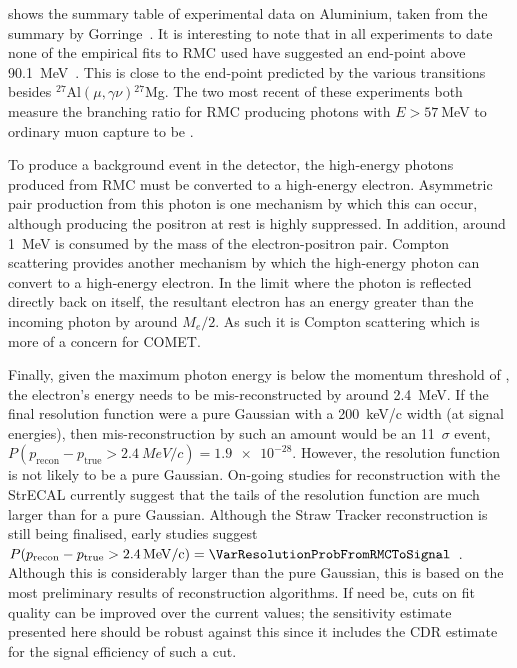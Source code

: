 \FigRMCExperiments

 shows the summary table of experimental data on Aluminium, taken from the summary by Gorringe~\cite{RevModPhys.76.31}.
It is interesting to note that in all experiments to date none of the empirical fits to RMC used have suggested an end-point above 90.1~MeV~\cite{PhysRevC.37.1633,PhysRevC.46.1094,PhysRevC.59.2853}.
This is close to the end-point predicted by the various transitions besides ${}^{27}$Al$(\mu,\gamma\nu){}^{27}$Mg.
The two most recent of these experiments both measure the branching ratio for \ac{RMC} producing photons with $E>57~$MeV to ordinary muon capture to be . 

To produce a background event in the detector, the high-energy photons produced from RMC must be converted to a high-energy electron.
Asymmetric pair production from this photon is one mechanism by which this can occur, although producing the positron at rest is highly suppressed.
In addition, around 1~MeV is consumed by the mass of the electron-positron pair.
Compton scattering provides another mechanism by which the high-energy photon can convert to a high-energy electron.
In the limit where the photon is reflected directly back on itself, the resultant electron has an energy greater than the incoming photon by around $M_e/2$.
As such it is Compton scattering which is more of a concern for COMET.

Finally, given the maximum photon energy is below the momentum threshold of \VarMomThreshold, the electron's energy needs to be mis-reconstructed by around 2.4~MeV.
If the final resolution function were a pure Gaussian with a 200~keV/c width (at signal energies), then mis-reconstruction by such an amount would be an 11~$\sigma$ event, \ie $P(p_\textrm{recon}-p_\textrm{true}>\SI{2.4}{MeV/c})=\num{1.9e-28}$.
However, the resolution function is not likely to be a pure Gaussian.
On-going studies for reconstruction with the  \phaseI StrECAL currently suggest that the tails of the resolution function are much larger than for a pure Gaussian.
Although the \phaseI Straw Tracker reconstruction is still being finalised, early studies suggest 
$P(p_\textrm{recon}-p_\textrm{true}>\SI{2.4}{MeV/c})=\VarResolutionProbFromRMCToSignal$~\cite{YFujiiStrECALRecon}.
Although this is considerably larger than the pure Gaussian, this is based on the most preliminary results of reconstruction algorithms.
If need be, cuts on fit quality can be improved over the current \phaseI values; the sensitivity estimate presented here should be robust against this since it includes the CDR estimate for the signal efficiency of such a cut.

